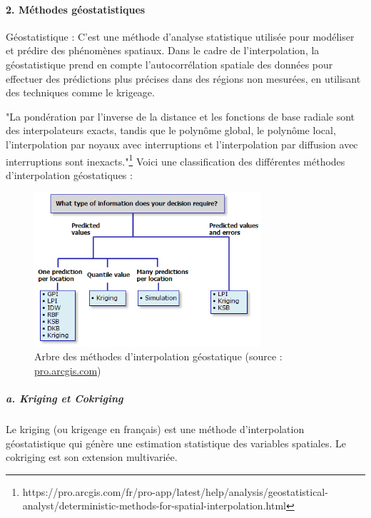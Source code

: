 \paragraph{2. Méthodes géostatistiques}
\phantom{-}
\newline
Géostatistique : C'est une méthode d'analyse statistique utilisée pour modéliser et prédire des phénomènes spatiaux. Dans le cadre de l'interpolation, la géostatistique prend en compte l'autocorrélation spatiale des données pour effectuer des prédictions plus précises dans des régions non mesurées, en utilisant des techniques comme le krigeage.



"La pondération par l’inverse de la distance et les fonctions de base radiale sont des interpolateurs exacts, tandis que le polynôme global, le polynôme local, l’interpolation par noyaux avec interruptions et l’interpolation par diffusion avec interruptions sont inexacts."\footnote{https://pro.arcgis.com/fr/pro-app/latest/help/analysis/geostatistical-analyst/deterministic-methods-for-spatial-interpolation.html}
Voici une classification des différentes méthodes d'interpolation géostatiques :

\begin{figure}[H]
    \centering
    \includegraphics[width=0.75\textwidth]{images/arcgis.png}
    \caption{Arbre des méthodes d'interpolation géostatique (source : \href{https://pro.arcgis.com/fr/pro-app/latest/help/analysis/geostatistical-analyst/classification-trees-of-the-interpolation-methods-offered-in-geostatistical-analyst.htm}{pro.arcgis.com})}
    \label{fig:arcgis}
\end{figure}


\subparagraph{a. Kriging et Cokriging} %
Le kriging (ou krigeage en français) est une méthode d'interpolation géostatistique qui génère une estimation statistique des variables spatiales. Le cokriging est son extension multivariée. 

